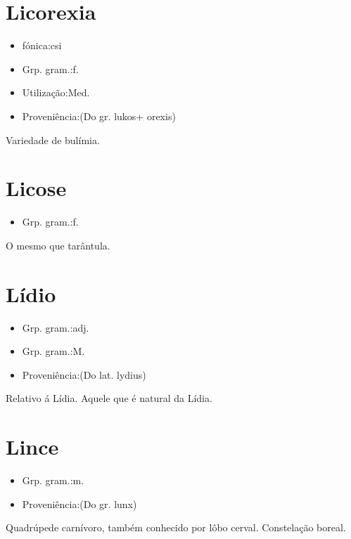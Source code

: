 \section{Licorexia}
\begin{itemize}
\item {fónica:csi}
\end{itemize}
\begin{itemize}
\item {Grp. gram.:f.}
\end{itemize}
\begin{itemize}
\item {Utilização:Med.}
\end{itemize}
\begin{itemize}
\item {Proveniência:(Do gr. \textunderscore lukos\textunderscore  + \textunderscore orexis\textunderscore )}
\end{itemize}
Variedade de bulímia.
\section{Licose}
\begin{itemize}
\item {Grp. gram.:f.}
\end{itemize}
O mesmo que \textunderscore tarântula\textunderscore .
\section{Lídio}
\begin{itemize}
\item {Grp. gram.:adj.}
\end{itemize}
\begin{itemize}
\item {Grp. gram.:M.}
\end{itemize}
\begin{itemize}
\item {Proveniência:(Do lat. \textunderscore lydius\textunderscore )}
\end{itemize}
Relativo á Lídia.
Aquele que é natural da Lídia.
\section{Lince}
\begin{itemize}
\item {Grp. gram.:m.}
\end{itemize}
\begin{itemize}
\item {Proveniência:(Do gr. \textunderscore lunx\textunderscore )}
\end{itemize}
Quadrúpede carnívoro, também conhecido por \textunderscore lôbo cerval\textunderscore .
Constelação boreal.
